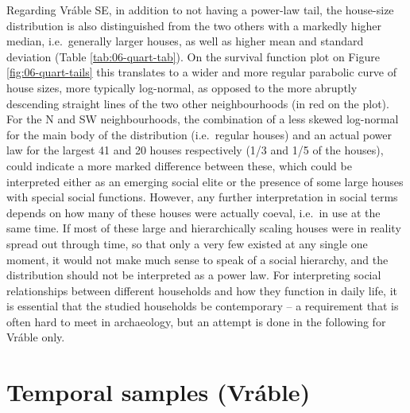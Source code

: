 \documentclass[
  12pt,
]{book}
\begin{document}
Regarding Vráble SE, in addition to not having a power-law tail, the house-size distribution is also distinguished from the two others with a markedly higher median, i.e.~generally larger houses, as well as higher mean and standard deviation (Table \ref{tab:06-quart-tab}). On the survival function plot on Figure \ref{fig:06-quart-tails} this translates to a wider and more regular parabolic curve of house sizes, more typically log-normal, as opposed to the more abruptly descending straight lines of the two other neighbourhoods (in red on the plot). For the N and SW neighbourhoods, the combination of a less skewed log-normal for the main body of the distribution (i.e.~regular houses) and an actual power law for the largest 41 and 20 houses respectively (1/3 and 1/5 of the houses), could indicate a more marked difference between these, which could be interpreted either as an emerging social elite or the presence of some large houses with special social functions. However, any further interpretation in social terms depends on how many of these houses were actually coeval, i.e.~in use at the same time. If most of these large and hierarchically scaling houses were in reality spread out through time, so that only a very few existed at any single one moment, it would not make much sense to speak of a social hierarchy, and the distribution should not be interpreted as a power law. For interpreting social relationships between different households and how they function in daily life, it is essential that the studied households be contemporary -- a requirement that is often hard to meet in archaeology, but an attempt is done in the following for Vráble only.

\FloatBarrier

\hypertarget{temporal-samples-vruxe1ble}{%
\section{Temporal samples (Vráble)}\label{temporal-samples-vruxe1ble}}
\end{document}
